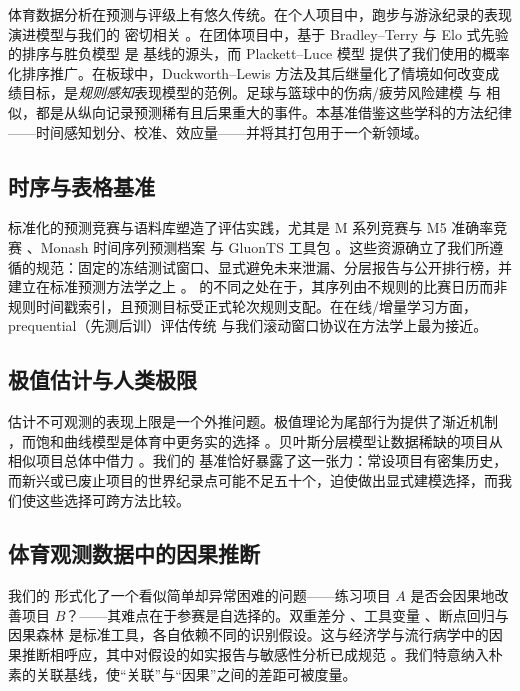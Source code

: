体育数据分析在预测与评级上有悠久传统。在个人项目中，跑步与游泳纪录的表现演进模型与我们的  密切相关 \citep{tatem_sprint, nevill_running}。在团体项目中，基于 Bradley--Terry 与 Elo 式先验的排序与胜负模型 \citep{bradley_terry, elo} 是  基线的源头，而 Plackett--Luce 模型 \citep{plackett_luce} 提供了我们使用的概率化排序推广。在板球中，Duckworth--Lewis 方法及其后继量化了情境如何改变成绩目标，是\emph{规则感知}表现模型的范例。足球与篮球中的伤病/疲劳风险建模 \citep{injury_prediction} 与  相似，都是从纵向记录预测稀有且后果重大的事件。本基准借鉴这些学科的方法纪律——时间感知划分、校准、效应量——并将其打包用于一个新领域。

\subsection{时序与表格基准}
\label{sec:related-ts}

标准化的预测竞赛与语料库塑造了评估实践，尤其是 M 系列竞赛与 M5 准确率竞赛 \citep{m5_competition}、Monash 时间序列预测档案 \citep{monash_tsf} 与 GluonTS 工具包 \citep{gluonts}。这些资源确立了我们所遵循的规范：固定的冻结测试窗口、显式避免未来泄漏、分层报告与公开排行榜，并建立在标准预测方法学之上 \citep{hyndman_fpp3}。\wcabench{} 的不同之处在于，其序列由不规则的比赛日历而非规则时间戳索引，且预测目标受正式轮次规则支配。在在线/增量学习方面，prequential（先测后训）评估传统 \citep{prequential} 与我们滚动窗口协议在方法学上最为接近。

\subsection{极值估计与人类极限}
\label{sec:related-evt}

估计不可观测的表现上限是一个外推问题。极值理论为尾部行为提供了渐近机制 \citep{evt_coles, pickands}，而饱和曲线模型是体育中更务实的选择 \citep{nevill_running, tatem_sprint}。贝叶斯分层模型让数据稀缺的项目从相似项目总体中借力 \citep{bayesian_hierarchical}。我们的  基准恰好暴露了这一张力：常设项目有密集历史，而新兴或已废止项目的世界纪录点可能不足五十个，迫使做出显式建模选择，而我们使这些选择可跨方法比较。

\subsection{体育观测数据中的因果推断}
\label{sec:related-causal}

我们的  形式化了一个看似简单却异常困难的问题——练习项目 $A$ 是否会因果地改善项目 $B$？——其难点在于参赛是自选择的。双重差分 \citep{did}、工具变量 \citep{iv}、断点回归与因果森林 \citep{causal_forest} 是标准工具，各自依赖不同的识别假设。这与经济学与流行病学中的因果推断相呼应，其中对假设的如实报告与敏感性分析已成规范 \citep{sensitivity_analysis}。我们特意纳入朴素的关联基线，使“关联”与“因果”之间的差距可被度量。

